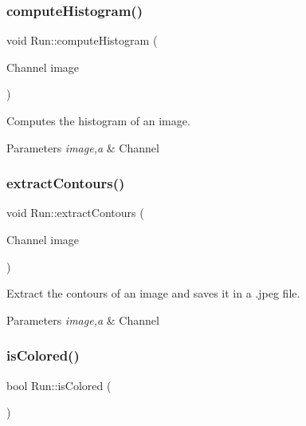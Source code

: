 \subsubsection{\texorpdfstring{compute\+Histogram()}{computeHistogram()}}
{\footnotesize\ttfamily void Run\+::compute\+Histogram (\begin{DoxyParamCaption}\item[{Channel}]{image }\end{DoxyParamCaption})}



Computes the histogram of an image. 


\begin{DoxyParams}{Parameters}
{\em image,a} & Channel \\
\hline
\end{DoxyParams}
\mbox{\label{class_run_afa7093c55a83956621e6b865f7b7d427}} 
\subsubsection{\texorpdfstring{extract\+Contours()}{extractContours()}}
{\footnotesize\ttfamily void Run\+::extract\+Contours (\begin{DoxyParamCaption}\item[{Channel}]{image }\end{DoxyParamCaption})}



Extract the contours of an image and saves it in a .jpeg file. 


\begin{DoxyParams}{Parameters}
{\em image,a} & Channel \\
\hline
\end{DoxyParams}
\mbox{\label{class_run_acb7e1319ac1b8d82f932de967d31689d}} 
\subsubsection{\texorpdfstring{is\+Colored()}{isColored()}}
{\footnotesize\ttfamily bool Run\+::is\+Colored (\begin{DoxyParamCaption}{ }\end{DoxyParamCaption})}



